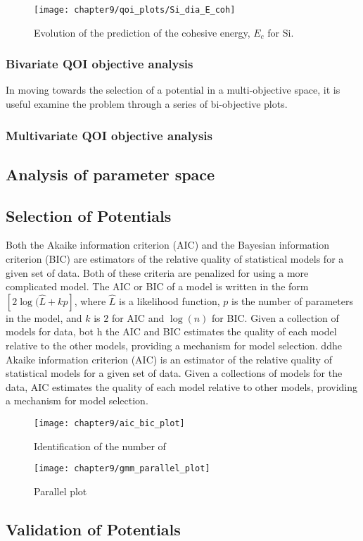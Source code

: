 \begin{figure}
	\centering
	\captionsetup{justification=centering,margin=1in}
	\texttt{[image: chapter9/qoi\_plots/Si\_dia\_E\_coh]}
	\caption{Evolution of the prediction of the cohesive energy, $E_c$ for Si.}
	\label{fig:Si_qoi_E_coh}
\end{figure}
\subsubsection{Bivariate QOI objective analysis}
In moving towards the selection of a potential in a multi-objective space, it is useful examine the problem through a series of bi-objective plots.

\subsubsection{Multivariate QOI objective analysis}

\subsection{Analysis of parameter space}
\subsection{Selection of Potentials}

Both the Akaike information criterion (AIC)\cite{akaike1998_aic} and the Bayesian information criterion (BIC) \cite{schwarz1978_bic} 
are estimators of the relative quality of statistical models for a given set of data.  
Both of these criteria are penalized for using a more complicated model.  The AIC or BIC of a model is written in the form $[2\log(\hat{L}+kp]$, where $\hat{L}$ is a likelihood function, $p$ is the number of parameters in the model, and $k$ is $2$ for AIC and $\log(n)$ for BIC.
Given a collection of models for data, bot h the AIC and BIC estimates the quality of each model relative to the other models, providing a mechanism for model selection.  
ddhe Akaike information criterion (AIC) \cite{akaike1998_aic} is an estimator of the relative quality of statistical models for a given set of data.   Given a collections of models for the data, AIC estimates the quality of each model relative to other models, providing a mechanism for model selection.


\begin{figure}
	\centering
	\captionsetup{justification=centering,margin=1in}
	\texttt{[image: chapter9/aic\_bic\_plot]}
	\caption{Identification of the number of }
	\label{fig:Si_Ec_a0_aic_bic}
\end{figure}

\begin{figure}[hbt]
	\centering
	\captionsetup{justification=centering,margin=1in}
	\texttt{[image: chapter9/gmm\_parallel\_plot]}
	\caption{Parallel plot}
	\label{fig:Si_gmm_parallel_plot_2_qoi}
\end{figure}

\subsection{Validation of Potentials}

